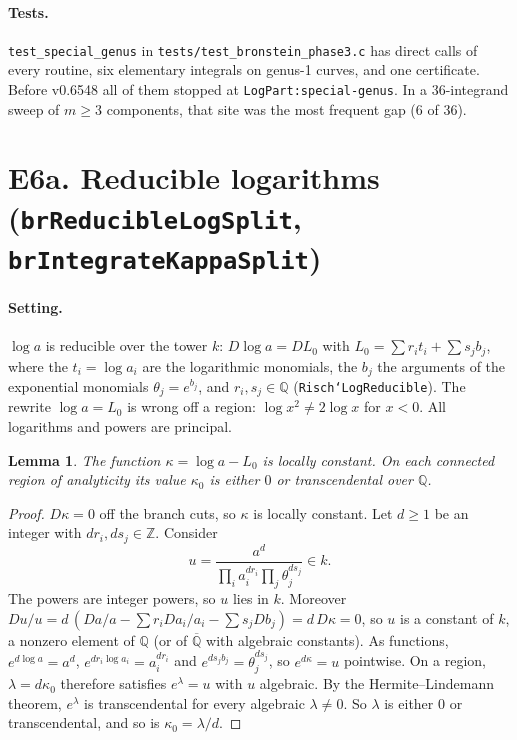 \documentclass[11pt]{article}
\newtheorem{lemma}[theorem]{Lemma}
\theoremstyle{definition}
\theoremstyle{remark}
\newcommand{\Q}{\mathbb{Q}}
\newcommand{\Z}{\mathbb{Z}}
\newcommand{\Qbar}{\overline{\mathbb{Q}}}
\newcommand{\code}[1]{\texttt{#1}}
\begin{document}
\paragraph{Tests.} \code{test\_special\_genus} in
\code{tests/test\_bronstein\_phase3.c} has direct calls of every routine, six
elementary integrals on genus-1 curves, and one certificate. Before v0.6548 all
of them stopped at \code{LogPart:special-genus}. In a 36-integrand sweep of
$m\ge3$ components, that site was the most frequent gap (6 of 36).

\section*{E6a. Reducible logarithms (\code{brReducibleLogSplit}, \code{brIntegrateKappaSplit})}

\paragraph{Setting.} $\log a$ is reducible over the tower $k$: $D\log a=DL_0$
with $L_0=\sum r_i t_i+\sum s_j b_j$, where the $t_i=\log a_i$ are the
logarithmic monomials, the $b_j$ the arguments of the exponential monomials
$\theta_j=e^{b_j}$, and $r_i,s_j\in\Q$ (\code{Risch`LogReducible}). The rewrite
$\log a=L_0$ is wrong off a region: $\log x^2\ne2\log x$ for $x<0$. All
logarithms and powers are principal.

\begin{lemma}\label{lem:kappa}
The function $\kappa=\log a-L_0$ is locally constant. On each connected region
of analyticity its value $\kappa_0$ is either $0$ or transcendental over $\Q$.
\end{lemma}

\begin{proof}
$D\kappa=0$ off the branch cuts, so $\kappa$ is locally constant. Let $d\ge1$
be an integer with $dr_i,ds_j\in\Z$. Consider
\[ u=\frac{a^d}{\prod_i a_i^{dr_i}\prod_j\theta_j^{ds_j}}\in k. \]
The powers are integer powers, so $u$ lies in $k$. Moreover
$Du/u=d\,(Da/a-\sum r_iDa_i/a_i-\sum s_jDb_j)=d\,D\kappa=0$, so $u$ is a
constant of $k$, a nonzero element of $\Q$ (or of $\Qbar$ with algebraic
constants). As functions, $e^{d\log a}=a^d$, $e^{dr_i\log a_i}=a_i^{dr_i}$ and
$e^{ds_jb_j}=\theta_j^{ds_j}$, so $e^{d\kappa}=u$ pointwise. On a region,
$\lambda=d\kappa_0$ therefore satisfies $e^\lambda=u$ with $u$ algebraic. By the
Hermite--Lindemann theorem, $e^\lambda$ is transcendental for every algebraic
$\lambda\ne0$. So $\lambda$ is either $0$ or transcendental, and so is
$\kappa_0=\lambda/d$.
\end{proof}
\end{document}
